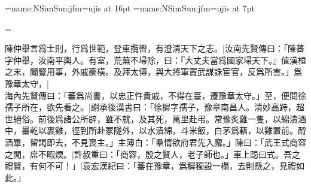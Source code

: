 
\jfont\Song={name:NSimSun:jfm=ujis} at 16pt
\jfont\smallSong={name:NSimSun:jfm=ujis} at 7pt


\zmh@depth=8pt
\guji@everytwolinemode={\smallSong\baselineskip=8pt\zmh@depth=4pt}
\guji@twolineraise=0pt

\Song

\guji

\vskip 5pt

陳仲舉言爲士則，行爲世範，登車攬轡，有澄清天下之志。|{汝南先賢傳曰：「陳蕃字仲舉，汝南平輿人。有室，荒蕪不埽除，曰：『大丈夫當爲國家埽天下。』值漢桓之末，閹豎用事，外戚豪橫。及拜太傅，與大將軍竇武謀誅宦官，反爲所害。」}爲豫章太守，|{海內先賢傳曰：「蕃爲尚書，以忠正忤貴戚，不得在臺，遷豫章太守。」}至，便問徐孺子所在，欲先看之。|{謝承後漢書曰：「徐穉字孺子，豫章南昌人。清妙高跱，超世絕俗。前後爲諸公所辟，雖不就，及其死，萬里赴弔。常豫炙雞一隻，以綿漬酒中，㬥乾以裹雞，徑到所赴冢隧外，以水漬綿，斗米飯，白茅爲藉，以雞置前。酹酒畢，留謁即去，不見喪主。」}主簿白：「羣情欲府君先入廨。」陳曰：「武王式商容之閭，席不暇煗。|{許叔重曰：「商容，殷之賢人，老子師也。」車上跽曰式。}吾之禮賢，有何不可！」|{袁宏漢紀曰：「蕃在豫章，爲穉獨設⼀榻，去則懸之，見禮如此。」}
\endguji
\bye

